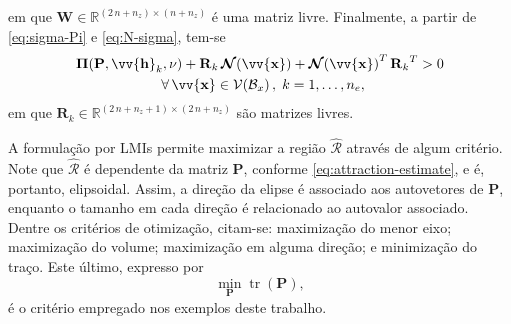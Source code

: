 \documentclass{ppgeesa}
\DeclareMathOperator{\trace}{tr}
\newcommand*{\Round}[1]{\left(#1\right)}
\newcommand*{\Prod}{\,}
\newcommand*{\Bold}[1]{\boldsymbol{\mathbf{#1}}}
\newcommand*{\Matr}[1]{\Bold{#1}}
\newcommand*{\Vect}[1]{\vv{\Bold{#1}}}
\newcommand*{\Transp}[1]{{#1}^{T}}
\newcommand*{\Trace}[1]{\trace\Round{#1}}
\newcommand*{\ForAll}{\:\:\forall\,}
\begin{document}
em que $\Matr{W} \in \mathbb{R}^{(2 \Prod n + n_z) \times (n + n_z)}$ é uma matriz livre.
Finalmente, a partir de \eqref{eq:sigma-Pi} e \eqref{eq:N-sigma}, tem-se
\begin{equation}\label{eq:constraint-pi}
  \begin{gathered}
    \Matr{\Pi}(\Matr{P}, \Vect{h}_k, \nu) + \Matr{R}_k \Prod \Matr{\mathcal{N}}(\Vect{x}) + \Transp{\Matr{\mathcal{N}}(\Vect{x})} \Prod \Transp{\Matr{R}_k} > 0
    \\\ForAll \Vect{x} \in \mathcal{V}(\mathcal{B}_x)
    \,,\; k = 1, \dotsc, n_e
    ,
  \end{gathered}
\end{equation}
em que $\Matr{R}_k \in \mathbb{R}^{(2 \Prod n + n_z + 1) \times (2 \Prod n + n_z)}$ são matrizes livres.

A formulação por LMIs permite maximizar a região $\hat{\mathcal{R}}$ através de algum critério.
Note que $\hat{\mathcal{R}}$ é dependente da matriz $\Matr{P}$, conforme \eqref{eq:attraction-estimate}, e é, portanto, elipsoidal.
Assim, a direção da elipse é associado aos autovetores de $\Matr{P}$, enquanto o tamanho em cada direção é relacionado ao autovalor associado.
Dentre os critérios de otimização, citam-se:
maximização do menor eixo;
maximização do volume;
maximização em alguma direção; e
minimização do traço.
Este último, expresso por
\begin{equation}\label{eq:objective}
  \min_{\Matr{P}} \Trace{\Matr{P}}
  ,
\end{equation}
é o critério empregado nos exemplos deste trabalho.
\end{document}

